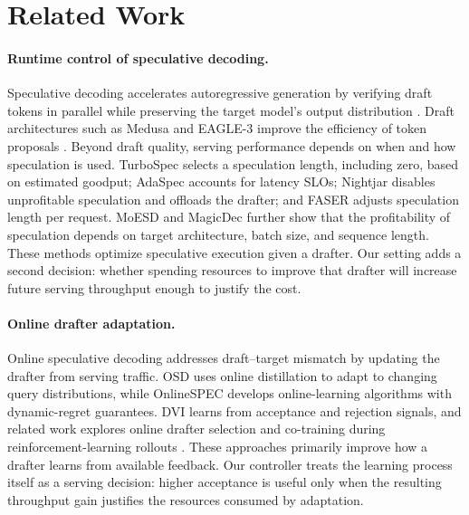 
\section{Related Work}\label{sec:related}

\paragraph{Runtime control of speculative decoding.}
Speculative decoding accelerates autoregressive generation by verifying draft tokens in parallel while preserving the target model's output distribution \citep{leviathan2023fast,chen2023accelerating,miao2024specinfer}. Draft architectures such as Medusa and EAGLE-3 improve the efficiency of token proposals \citep{cai2024medusa,li2024eagle,li2024eagle2,li2025eagle3}. Beyond draft quality, serving performance depends on when and how speculation is used. TurboSpec \citep{liu2024turbospec} selects a speculation length, including zero, based on estimated goodput; AdaSpec \citep{huang2025adaspec} accounts for latency SLOs; Nightjar \citep{li2025nightjar} disables unprofitable speculation and offloads the drafter; and FASER \citep{chen2026faser} adjusts speculation length per request. MoESD \citep{huang2025moesd} and MagicDec \citep{sadhukhan2025magicdec} further show that the profitability of speculation depends on target architecture, batch size, and sequence length. These methods optimize speculative execution given a drafter. Our setting adds a second decision: whether spending resources to improve that drafter will increase future serving throughput enough to justify the cost.

\paragraph{Online drafter adaptation.}
Online speculative decoding addresses draft--target mismatch by updating the drafter from serving traffic. OSD \citep{liu2024osd} uses online distillation to adapt to changing query distributions, while OnlineSPEC \citep{qian2026drafts} develops online-learning algorithms with dynamic-regret guarantees. DVI \citep{bhansali2025dvi} learns from acceptance and rejection signals, and related work explores online drafter selection \citep{liu2026notabandit} and co-training during reinforcement-learning rollouts \citep{wang2026cotraining}. These approaches primarily improve how a drafter learns from available feedback. Our controller treats the learning process itself as a serving decision: higher acceptance is useful only when the resulting throughput gain justifies the resources consumed by adaptation.

